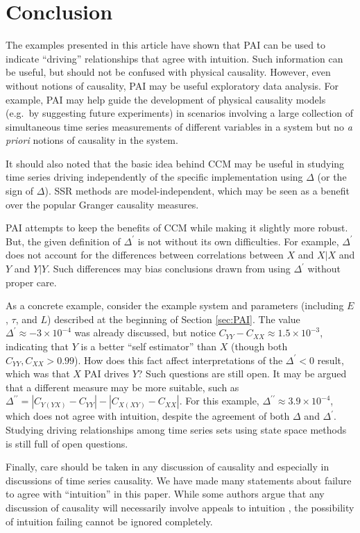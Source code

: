 \documentclass[twocolumn,aps,pre,groupedaddress]{revtex4-1}
\begin{document}
\section{Conclusion}
The examples presented in this article have shown that PAI can be used to indicate ``driving'' relationships that agree with intuition.  Such information can be useful, but should not be confused with physical causality.  However, even without notions of causality, PAI may be useful exploratory data analysis.  For example, PAI may help guide the development of physical causality models (e.g.\ by suggesting future experiments) in scenarios involving a large collection of simultaneous time series measurements of different variables in a system but no {\em a priori} notions of causality in the system.

It should also noted that the basic idea behind CCM may be useful in studying time series driving independently of the specific implementation using $\Delta$ (or the sign of $\Delta$). SSR methods are model-independent, which may be seen as a benefit over the popular Granger causality measures.  

PAI attempts to keep the benefits of CCM while making it slightly more robust.  But, the given definition of $\Delta^\prime$ is not without its own difficulties.  For example, $\Delta^\prime$ does not account for the differences between correlations between $X$ and $X|X$ and $Y$ and $Y|Y$.  Such differences may bias conclusions drawn from using $\Delta^\prime$ without proper care.  

As a concrete example, consider the example system and parameters (including $E$, $\tau$, and $L$) described at the beginning of Section \ref{sec:PAI}.  The value $\Delta^\prime \approx -3\times 10^{-4}$ was already discussed, but notice $C_{YY}-C_{XX} \approx 1.5\times10^{-3}$, indicating that $Y$ is a better ``self estimator'' than $X$ (though both $C_{YY},C_{XX}>0.99$).  How does this fact affect interpretations of the $\Delta^\prime<0$ result, which was that $X$ PAI drives $Y$?  Such questions are still open.  It may be argued that a different measure may be more suitable, such as $\Delta^{\prime\prime} = |C_{Y(YX)}-C_{YY}|-|C_{X(XY)}-C_{XX}|$.  For this example, $\Delta^{\prime\prime} \approx 3.9\times 10^{-4}$, which does not agree with intuition, despite the agreement of both $\Delta$ and $\Delta^\prime$.  Studying driving relationships among time series sets using state space methods is still full of open questions.

Finally, care should be taken in any discussion of causality and especially in discussions of time series causality.  We have made many statements about failure to agree with ``intuition'' in this paper.  While some authors argue that any discussion of causality will necessarily involve appeals to intuition \cite{Pearl2000}, the possibility of intuition failing cannot be ignored completely.  
\end{document}
